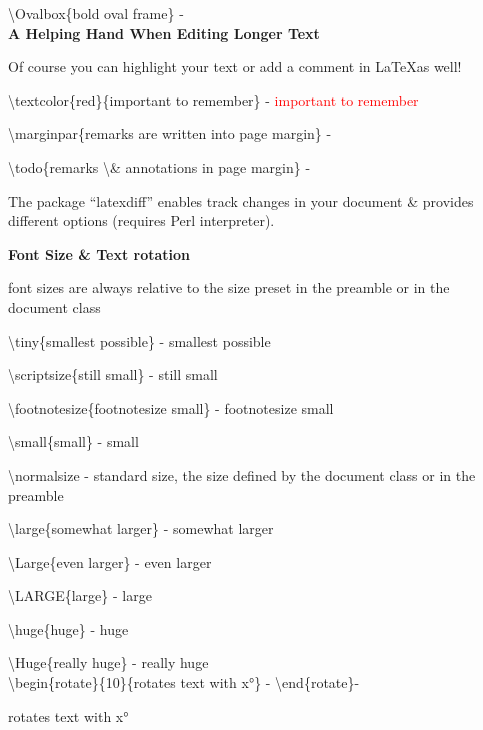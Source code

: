 \documentclass[a4paper,12pt,final]{article}
\begin{document}
\textbackslash Ovalbox\{bold oval frame\} -  \\



\large \textbf{A Helping Hand When Editing Longer Text}
\normalsize

Of course you can highlight your text or add a comment in \LaTeX as well! 

\textbackslash textcolor\{red\}\{important to remember\} - \textcolor{red}{important to remember}

\textbackslash marginpar\{remarks are written into page margin\} - 

\textbackslash todo\{remarks \textbackslash \& annotations in page margin\} - 

The package ``latexdiff'' enables track changes in your document \& provides different options (requires Perl interpreter). 




\newpage
\large \textbf{Font Size \& Text rotation}
\normalsize

font sizes are always relative to the size preset in the preamble or in the document class 

\textbackslash tiny\{smallest possible\} - \tiny{smallest possible} \normalsize

\textbackslash scriptsize\{still small\} - \scriptsize{still small} \normalsize 

\textbackslash footnotesize\{footnotesize small\} - \footnotesize{footnotesize small} \normalsize 

\textbackslash small\{small\} - \small{small} \normalsize 

\textbackslash normalsize - \normalsize{standard size, the size defined by the document class or in the preamble}

\textbackslash large\{somewhat larger\} - \large{somewhat larger} \normalsize 

\textbackslash Large\{even larger\} - \Large{even larger} \normalsize 

\textbackslash LARGE\{large\} - \LARGE{large} \normalsize 

\textbackslash huge\{huge\} - \huge{huge } \normalsize 

\textbackslash Huge\{really huge\} - \Huge{really huge} 
\normalsize \\


\textbackslash begin\{rotate\}\{10\}\{rotates text with x°\} - \textbackslash end\{rotate\}- 
\begin{rotate}{10} rotates text with x° \end{rotate} \\ \\ 
\end{document}

